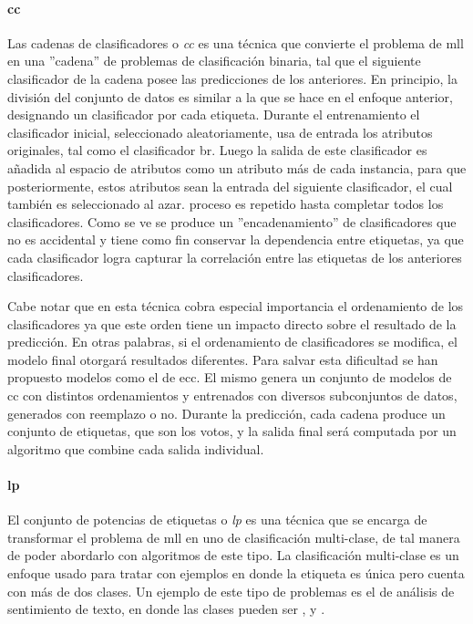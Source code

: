 \paragraph{\acrfull{cc}}

Las cadenas de clasificadores o \textit{\acrlong{cc}}
\cite{read_classifier_2011} es una técnica que convierte el problema de
\acrshort{mll} en una ”cadena” de problemas de clasificación binaria, tal que el
siguiente clasificador de la cadena posee las predicciones de los anteriores. En
principio, la división del conjunto de datos es similar a la que se hace en el
enfoque anterior, designando un clasificador por cada etiqueta. Durante el
entrenamiento el clasificador inicial, seleccionado aleatoriamente, usa de
entrada los atributos originales, tal como el clasificador \acrshort{br}. Luego
la salida de este clasificador es añadida al espacio de atributos como un
atributo más de cada instancia, para que posteriormente, estos atributos sean la
entrada del siguiente clasificador, el cual también es seleccionado al azar.
proceso es repetido hasta completar todos los clasificadores.  Como se ve se
produce un ”encadenamiento” de clasificadores que no es accidental y tiene como
fin conservar la dependencia entre etiquetas, ya que cada clasificador logra
capturar la correlación entre las etiquetas de los anteriores clasificadores. 

Cabe notar que en esta técnica cobra especial importancia el ordenamiento de los
clasificadores ya que este orden tiene un impacto directo sobre el resultado de
la predicción. En otras palabras, si el ordenamiento de clasificadores se
modifica, el modelo final otorgará resultados diferentes. Para salvar esta
dificultad se han propuesto modelos como el de \acrfull{ecc}. El mismo genera un
conjunto de modelos de \acrshort{cc} con distintos ordenamientos y entrenados
con diversos subconjuntos de datos, generados con reemplazo o no. Durante la
predicción, cada cadena produce un conjunto de etiquetas, que son los votos, y
la salida final será computada por un algoritmo que combine cada salida
individual.
 
\paragraph{\acrfull{lp}}

El conjunto de potencias de etiquetas o \textit{\acrlong{lp}}
\cite{tsoumakas_random_2011} es una técnica que se encarga de transformar el
problema de \acrshort{mll} en uno de clasificación multi-clase, de tal manera de
poder abordarlo con algoritmos de este tipo. La clasificación multi-clase es un
enfoque usado para tratar con ejemplos en donde la etiqueta es única pero cuenta
con más de dos clases. Un ejemplo de este tipo de problemas es el de análisis de
sentimiento de texto, en donde las clases pueden ser ,
 y . 

